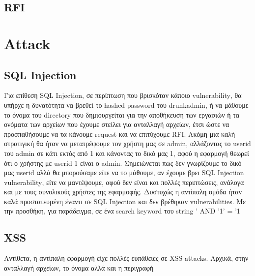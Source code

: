 \documentclass{article}
\begin{document}
\subsection*{\textlatin{RFI}}









\section*{\textlatin{Attack}}








\subsection*{\textlatin{SQL Injection}}
Για επίθεση \textlatin{SQL Injection}, σε περίπτωση που βρισκόταν κάποιο \textlatin{vulnerability}, θα υπήρχε η δυνατότητα να βρεθεί το \textlatin{hashed password} του \textlatin{drunkadmin}, ή να μάθουμε το όνομα του \textlatin{directory} που δημιουργείται για την αποθήκευση των εργασιών ή τα ονόματα των αρχείων που έχουμε στείλει για ανταλλαγή αρχείων, έτσι ώστε να προσπαθήσουμε να τα κάνουμε \textlatin{request} και να επιτύχουμε \textlatin{RFI}. Ακόμη μια καλή στρατιγική θα ήταν να μετατρέψουμε τον χρήστη μας σε \textlatin{admin}, αλλάζοντας το \textlatin{userid} του \textlatin{admin} σε κάτι εκτός από 1 και κάνοντας το δικό μας 1, αφού η εφαρμογή θεωρεί ότι ο χρήστης με \textlatin{userid} 1 είναι ο \textlatin{admin}. Σημειώνεται πως δεν γνωρίζουμε το δικό μας \textlatin{userid} αλλά θα μπορούσαμε είτε να το μάθουμε, αν έχουμε βρει \textlatin{SQL Injection vulnerability}, είτε να μαντέψουμε, αφού δεν είναι και πολλές περιπτώσεις, ανάλογα και με τους συνολικούς χρήστες της εφαρμοφής. Δυστυχώς η αντίπαλη ομάδα ήταν καλά προστατευμένη έναντι σε \textlatin{SQL Injection} και δεν βρέθηκαν \textlatin{vulnerabilities}. Με την προσθήκη, για παράδειγμα, σε ένα \textlatin{search keyword} του \textlatin{string ' AND '1' = '1}   





\subsection*{\textlatin{XSS}}
Αντίθετα, η αντίπαλη εφαρμογή είχε πολλές ευπάθειες σε \textlatin{XSS attacks}. Aρχικά, στην ανταλλαγή αρχείων, το όνομα αλλά και η περιγραφή 
\end{document}
